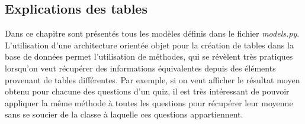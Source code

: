 \documentclass[a4,10pt,french]{sphinxmanual}
\begin{document}
\subsection{Explications des tables}
\label{database:explications-des-tables}
Dans ce chapitre sont présentés tous les modèles définis dans le fichier \emph{models.py}.
L'utilisation d'une architecture orientée objet pour la création de tables dans la base
de données permet l'utilisation de méthodes, qui se révèlent très pratiques lorsqu'on
veut récupérer des informations équivalentes depuis des éléments provenant de tables
différentes. Par exemple, si on veut afficher le résultat moyen obtenu pour chacune
des questions d'un quiz, il est très intéressant de pouvoir appliquer la même méthode
à toutes les questions pour récupérer leur moyenne sans se soucier de la classe à laquelle
ces questions appartiennent.
\end{document}
